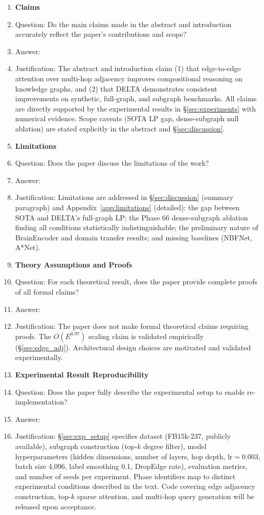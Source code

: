 \documentclass{article}
\begin{document}
\begin{enumerate}

\item {\bf Claims}
\item[] Question: Do the main claims made in the abstract and introduction accurately reflect the paper's contributions and scope?
\item[] Answer: \answerYes{}
\item[] Justification: The abstract and introduction claim (1) that edge-to-edge attention over multi-hop adjacency improves compositional reasoning on knowledge graphs, and (2) that DELTA demonstrates consistent improvements on synthetic, full-graph, and subgraph benchmarks. All claims are directly supported by the experimental results in \S\ref{sec:experiments} with numerical evidence. Scope caveats (SOTA LP gap, dense-subgraph null ablation) are stated explicitly in the abstract and \S\ref{sec:discussion}.

\item {\bf Limitations}
\item[] Question: Does the paper discuss the limitations of the work?
\item[] Answer: \answerYes{}
\item[] Justification: Limitations are addressed in \S\ref{sec:discussion} (summary paragraph) and Appendix~\ref{app:limitations} (detailed): the gap between SOTA and DELTA's full-graph LP; the Phase 66 dense-subgraph ablation finding all conditions statistically indistinguishable; the preliminary nature of BrainEncoder and domain transfer results; and missing baselines (NBFNet, A*Net).

\item {\bf Theory Assumptions and Proofs}
\item[] Question: For each theoretical result, does the paper provide complete proofs of all formal claims?
\item[] Answer: \answerNA{}
\item[] Justification: The paper does not make formal theoretical claims requiring proofs. The $O(E^{0.97})$ scaling claim is validated empirically (\S\ref{sec:edge_adj}). Architectural design choices are motivated and validated experimentally.

\item {\bf Experimental Result Reproducibility}
\item[] Question: Does the paper fully describe the experimental setup to enable re-implementation?
\item[] Answer: \answerYes{}
\item[] Justification: \S\ref{sec:exp_setup} specifies dataset (FB15k-237, publicly available), subgraph construction (top-$k$ degree filter), model hyperparameters (hidden dimensions, number of layers, hop depth, $\text{lr}{=}0.003$, batch size 4,096, label smoothing 0.1, DropEdge rate), evaluation metrics, and number of seeds per experiment. Phase identifiers map to distinct experimental conditions described in the text. Code covering edge adjacency construction, top-$k$ sparse attention, and multi-hop query generation will be released upon acceptance.


\end{enumerate}
\end{document}
